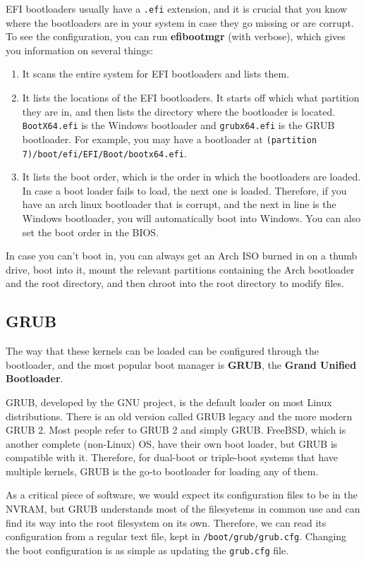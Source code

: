 \documentclass{article}
\begin{document}
  EFI bootloaders usually have a \texttt{.efi} extension, and it is crucial that you know where the bootloaders are in your system in case they go missing or are corrupt. To see the configuration, you can run \textbf{efibootmgr} (with verbose), which gives you information on several things: 
  \begin{enumerate} 
    \item It scans the entire system for EFI bootloaders and lists them. 
    \item It lists the locations of the EFI bootloaders. It starts off which what partition they are in, and then lists the directory where the bootloader is located. \texttt{BootX64.efi} is the Windows bootloader and \texttt{grubx64.efi} is the GRUB bootloader. For example, you may have a bootloader at \texttt{(partition 7)/boot/efi/EFI/Boot/bootx64.efi}. 
    \item It lists the boot order, which is the order in which the bootloaders are loaded. In case a boot loader fails to load, the next one is loaded. Therefore, if you have an arch linux bootloader that is corrupt, and the next in line is the Windows bootloader, you will automatically boot into Windows. You can also set the boot order in the BIOS. 
  \end{enumerate}

  In case you can't boot in, you can always get an Arch ISO burned in on a thumb drive, boot into it, mount the relevant partitions containing the Arch bootloader and the root directory, and then chroot into the root directory to modify files. 

  \subsection{GRUB}

    The way that these kernels can be loaded can be configured through the bootloader, and the most popular boot manager is \textbf{GRUB}, the \textbf{Grand Unified Bootloader}. 

    GRUB, developed by the GNU project, is the default loader on most Linux distributions. There is an old version called GRUB legacy and the more modern GRUB 2. Most people refer to GRUB 2 and simply GRUB. FreeBSD, which is another complete (non-Linux) OS, have their own boot loader, but GRUB is compatible with it. Therefore, for dual-boot or triple-boot systems that have multiple kernels, GRUB is the go-to bootloader for loading any of them. 

    As a critical piece of software, we would expect its configuration files to be in the NVRAM, but GRUB understands most of the filesystems in common use and can find its way into the root filesystem on its own. Therefore, we can read its configuration from a regular text file, kept in \texttt{/boot/grub/grub.cfg}. Changing the boot configuration is as simple as updating the \texttt{grub.cfg} file. 
\end{document}
